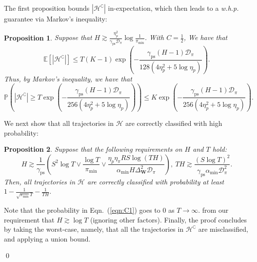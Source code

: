 \documentclass[twoside]{article}
\def\eqref#1{(\ref{#1})}
\def\mW{{\bm{W}}}
\def\gD{{\mathcal{D}}}
\def\gH{{\mathcal{H}}}
\def\sP{{\mathbb{P}}}
\newcommand{\E}{\mathbb{E}}
\theoremstyle{plain}
\newtheorem{proposition}{Proposition}[section]
\newcommand{\ps}{\mathrm{ps}}
\begin{document}
The first proposition bounds $|\gH^\complement|$ in-expectation, which then leads to a \textit{w.h.p.} guarantee via Markov's inequality:
\begin{proposition}
\label{prop:H-complement}
    Suppose that {\color{blue}$H \gtrsim \frac{\eta_p^2}{\gamma_\ps \gD_\pi} \log\frac{1}{\pi_{\min}}$}.
    With $C = \frac{1}{2}$, We have that
    \begin{equation}
        \E[|\gH^\complement|] \leq T (K - 1) \exp\left( - \frac{\gamma_\ps (H - 1) \gD_\pi}{128(4\eta_p^2 + 5 \log\eta_p)} \right).
    \end{equation}
    Thus, by Markov's inequality, we have that
    \begin{equation}
    \label{eqn:C1}
        \sP\left( |\gH^\complement| \geq T \exp\left( - \frac{\gamma_\ps (H - 1) \gD_\pi}{256(4\eta_p^2 + 5 \log\eta_p)} \right) \right) \leq K \exp\left( - \frac{\gamma_\ps (H - 1) \gD_\pi}{256(4\eta_p^2 + 5 \log\eta_p)} \right).
    \end{equation}
\end{proposition}
We next show that all trajectories in $\gH$ are correctly classified with high probability:
\begin{proposition}
\label{prop:H}
    Suppose that the following requirements on $H$ and $T$ hold:
    \begin{equation}
        H \gtrsim \frac{1}{\gamma_\ps} \left( S^2 \log T \vee \frac{\log T}{\pi_{\min}} \vee \frac{\eta_p \eta_\pi R S \log(TH)}{\alpha_{\min} H \Delta_\mW^2 \gD_\pi} \right), \
        TH \gtrsim \frac{(S \log T)^2}{\gamma_\ps \alpha_{\min} \gD_\pi^2}.
    \end{equation}
    Then, all trajectories in $\gH$ are correctly classified with probability at least $1 - \frac{1}{\sqrt{\pi_{\min}} T} - \frac{1}{TH}$.
\end{proposition}
Note that the probability in Eqn.~\eqref{eqn:C1} goes to $0$ as $T \rightarrow \infty$. from our requirement that $H \gtrsim \log T$ (ignoring other factors).
Finally, the proof concludes by taking the worst-case, namely, that all the trajectories in $\gH^\complement$ are misclassified, and applying a union bound.


\qed
\end{document}
